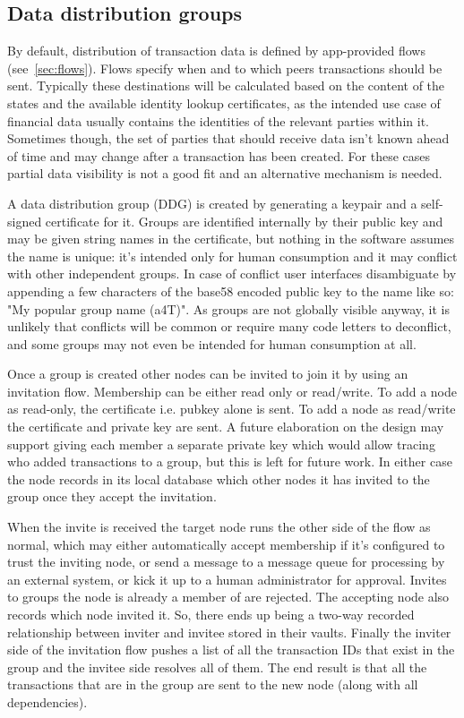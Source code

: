 \documentclass{article}
\begin{document}
\subsection{Data distribution groups}

By default, distribution of transaction data is defined by app-provided flows (see~\cref{sec:flows}). Flows specify
when and to which peers transactions should be sent. Typically these destinations will be calculated based on the
content of the states and the available identity lookup certificates, as the intended use case of financial data
usually contains the identities of the relevant parties within it. Sometimes though, the set of parties that should
receive data isn't known ahead of time and may change after a transaction has been created. For these cases partial
data visibility is not a good fit and an alternative mechanism is needed.

A data distribution group (DDG) is created by generating a keypair and a self-signed certificate for it. Groups are
identified internally by their public key and may be given string names in the certificate, but nothing in the
software assumes the name is unique: it's intended only for human consumption and it may conflict with other
independent groups. In case of conflict user interfaces disambiguate by appending a few characters of the base58
encoded public key to the name like so:  "My popular group name (a4T)". As groups are not globally visible anyway,
it is unlikely that conflicts will be common or require many code letters to deconflict, and some groups may not
even be intended for human consumption at all.

Once a group is created other nodes can be invited to join it by using an invitation flow. Membership can be either
read only or read/write. To add a node as read-only, the certificate i.e. pubkey alone is sent. To add a node as
read/write the certificate and private key are sent. A future elaboration on the design may support giving each
member a separate private key which would allow tracing who added transactions to a group, but this is left for
future work. In either case the node records in its local database which other nodes it has invited to the group
once they accept the invitation.

When the invite is received the target node runs the other side of the flow as normal, which may either
automatically accept membership if it's configured to trust the inviting node, or send a message to a message queue
for processing by an external system, or kick it up to a human administrator for approval. Invites to groups the
node is already a member of are rejected. The accepting node also records which node invited it. So, there ends up
being a two-way recorded relationship between inviter and invitee stored in their vaults. Finally the inviter side
of the invitation flow pushes a list of all the transaction IDs that exist in the group and the invitee side
resolves all of them. The end result is that all the transactions that are in the group are sent to the new node
(along with all dependencies).
\end{document}
